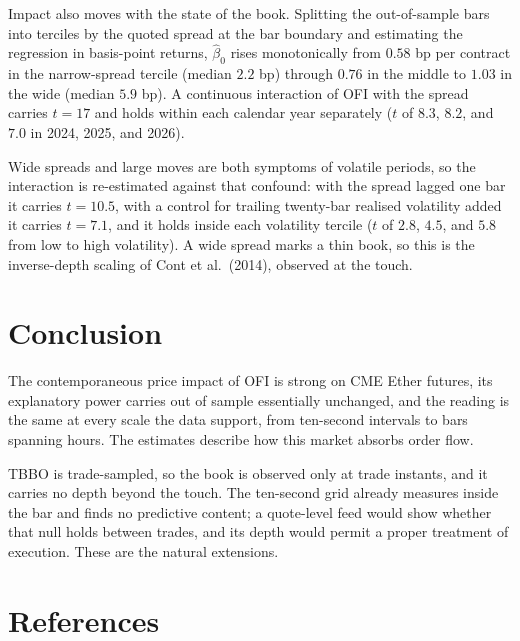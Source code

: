 \documentclass[11pt,a4paper]{article}
\begin{document}
Impact also moves with the state of the book. Splitting the out-of-sample bars into terciles by the quoted spread at the bar boundary and estimating the regression in basis-point returns, $\hat\beta_0$ rises monotonically from $0.58$ bp per contract in the narrow-spread tercile (median $2.2$ bp) through $0.76$ in the middle to $1.03$ in the wide (median $5.9$ bp). A continuous interaction of OFI with the spread carries $t = 17$ and holds within each calendar year separately ($t$ of $8.3$, $8.2$, and $7.0$ in 2024, 2025, and 2026).

Wide spreads and large moves are both symptoms of volatile periods, so the interaction is re-estimated against that confound: with the spread lagged one bar it carries $t = 10.5$, with a control for trailing twenty-bar realised volatility added it carries $t = 7.1$, and it holds inside each volatility tercile ($t$ of $2.8$, $4.5$, and $5.8$ from low to high volatility). A wide spread marks a thin book, so this is the inverse-depth scaling of Cont et al.\ (2014), observed at the touch.

\section{Conclusion}

The contemporaneous price impact of OFI is strong on CME Ether futures, its explanatory power carries out of sample essentially unchanged, and the reading is the same at every scale the data support, from ten-second intervals to bars spanning hours. The estimates describe how this market absorbs order flow.

TBBO is trade-sampled, so the book is observed only at trade instants, and it carries no depth beyond the touch. The ten-second grid already measures inside the bar and finds no predictive content; a quote-level feed would show whether that null holds between trades, and its depth would permit a proper treatment of execution. These are the natural extensions.

\section*{References}
\end{document}
